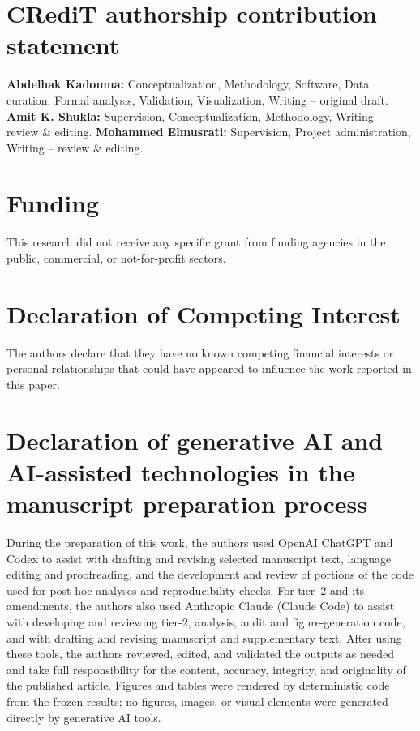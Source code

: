 \documentclass[5p,twocolumn]{elsarticle}
\begin{document}
\section*{CRediT authorship contribution statement}

\textbf{Abdelhak Kadouma:} Conceptualization, Methodology, Software, Data curation, Formal analysis, Validation, Visualization, Writing -- original draft. \textbf{Amit K. Shukla:} Supervision, Conceptualization, Methodology, Writing -- review \& editing. \textbf{Mohammed Elmusrati:} Supervision, Project administration, Writing -- review \& editing.


\section*{Funding}

This research did not receive any specific grant from funding agencies in
the public, commercial, or not-for-profit sectors.

\section*{Declaration of Competing Interest}

The authors declare that they have no known competing financial interests or
personal relationships that could have appeared to influence the work reported
in this paper.

\section*{Declaration of generative AI and AI-assisted technologies in the manuscript preparation process}

During the preparation of this work, the authors used OpenAI ChatGPT and Codex
to assist with drafting and revising selected manuscript text, language editing
and proofreading, and the development and review of portions of the code used
for post-hoc analyses and reproducibility checks. For tier~2 and
its amendments, the authors also used Anthropic Claude (Claude Code) to assist
with developing and reviewing tier-2, analysis, audit and
figure-generation code, and with drafting and revising manuscript and
supplementary text. After using these tools, the
authors reviewed, edited, and validated the outputs as needed and take full
responsibility for the content, accuracy, integrity, and originality of the
published article. Figures and tables were rendered by deterministic code
from the frozen results; no figures, images, or visual elements were
generated directly by generative AI tools.




\end{document}
